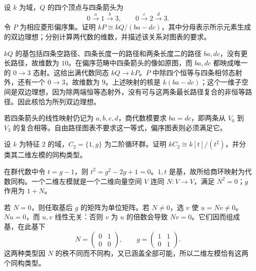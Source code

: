 \begin{exercise}\label{b4:ex:01-diamond-incidence-relation}
	设 \(k\) 为域，\(Q\) 的四个顶点与四条箭头为
	\[
		0\xrightarrow{a}1\xrightarrow{b}3, \qquad0\xrightarrow{c}2\xrightarrow{d}3.
	\]
	令 \(P\) 为相应菱形偏序集。证明 \(kP\cong kQ/(ba-dc)\)，其中分母表示所示元素生成的双边理想；分别计算两代数的维数，并描述该关系对图表的要求。
\end{exercise}
\begin{solution}
	\(kQ\) 的基包括四条空路径、四条长度一的路径和两条长度二的路径 \(ba,dc\)，没有更长路径，故维数为 \(10\)。在偏序范畴中四条箭头的像如原图，而 \(ba,dc\) 都映成唯一的 \(0\to3\) 态射。这给出满代数同态 \(kQ\to kP\)。\(P\) 中除四个恒等与四条相邻态射外，还有一个 \(0\to3\)，故维数为 \(9\)。上述映射的核是 \(k(ba-dc)\)；这个一维子空间是双边理想，因为除两端恒等态射外，没有可与这两条最长路径复合的非恒等路径。因此核恰为所列双边理想。

	若四条箭头的线性映射仍记为 \(a,b,c,d\)，商代数模要求 \(ba=dc\)，即两条从 \(V_0\) 到 \(V_3\) 的复合相等。自由路径图表不要求这一等式，偏序图表则必须满足它。
\end{solution}

\begin{exercise}\label{b4:ex:01-involution-characteristic-two}
	设 \(k\) 为特征 \(2\) 的域，\(C_2=\{1,g\}\) 为二阶循环群。证明 \(kC_2\cong k[t]/(t^2)\)，并分类其二维左模的同构类型。
\end{exercise}
\begin{solution}
	在群代数中令 \(t=g-1\)，则 \(t^2=g^2-2g+1=0\)。\(1,t\) 是基，故所给商环映射为代数同构。一个二维左模就是一个二维向量空间 \(V\) 连同 \(N:V\to V\)，满足 \(N^2=0\)；\(g\) 作用为 \(1+N\)。

	若 \(N=0\)，则任取基后 \(g\) 的矩阵为单位矩阵。若 \(N\ne0\)，选 \(v\) 使 \(u=Nv\ne0\)。\(Nu=0\)，而 \(u,v\) 线性无关：否则 \(v\) 为 \(u\) 的倍数会导致 \(Nv=0\)。它们因而组成基，在此基下
	\[
		N=\begin{pmatrix}0&1\\0&0\end{pmatrix},
		\qquad g=\begin{pmatrix}1&1\\0&1\end{pmatrix}.
	\]
	这两种类型因 \(N\) 的秩不同而不同构，又已涵盖全部可能，所以二维左模恰有这两个同构类型。
\end{solution}
